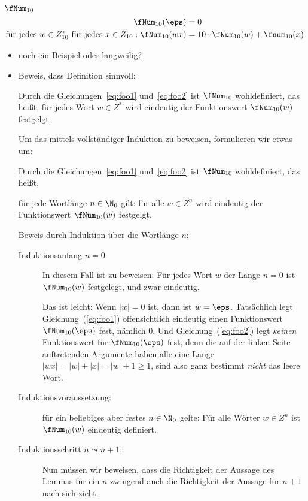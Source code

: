 %
\begin{tutorium}
\noindent\textbf{$\fNum_{10}$}
  \begin{align}
    \fNum_{10}(\eps) &= 0  \label{eq:foo1} \\
    \text{für jedes }  w\in Z_{10}^* \,\, \text{für jedes }  x\in Z_{10}: \fNum_{10}(wx) &= 10\cdot \fNum_{10}(w) + \fnum_{10}(x) \label{eq:foo2} 
  \end{align}


  \begin{itemize}
  \item noch ein Beispiel oder langweilig?
  \item Beweis, dass Definition sinnvoll:

    \begin{lemma}
      Durch die Gleichungen~\ref{eq:foo1} und~\ref{eq:foo2} ist
      $\fNum_{10}$ wohldefiniert, das heißt, für jedes Wort $w\in Z^*$
      wird eindeutig der Funktionswert $\fNum_{10}(w)$ festgelgt.
    \end{lemma}

    Um das mittels vollständiger Induktion zu beweisen, formulieren
    wir etwas um:

    \begin{lemma}
      Durch die Gleichungen~\ref{eq:foo1} und~\ref{eq:foo2} ist
      $\fNum_{10}$ wohldefiniert, das heißt, 

      für jede Wortlänge $n\in\N_0$ gilt: für alle $w\in Z^n$
      wird eindeutig der Funktionswert $\fNum_{10}(w)$ festgelgt.
    \end{lemma}

    \begin{beweis}
      Beweis durch Induktion über die Wortlänge $n$:

      \begin{description}
      \item[Induktionsanfang $n=0$:] In diesem Fall ist zu beweisen: Für
        jedes Wort $w$ der Länge $n=0$ ist $\fNum_{10}(w)$ festgelegt, und
        zwar eindeutig.

        Das ist leicht: Wenn $|w|=0$ ist, dann ist $w=\eps$. Tatsächlich
        legt Gleichung~(\ref{eq:foo1}) offensichtlich eindeutig einen
        Funktionswert $\fNum_{10}(\eps)$ fest, nämlich $0$. Und
        Gleichung~(\ref{eq:foo2}) legt \emph{keinen} Funktionswert für
        $\fNum_{10}(\eps)$ fest, denn die auf der linken Seite
        auftretenden Argumente haben alle eine Länge
        $|wx|=|w|+|x|=|w|+1\geq 1$, sind also ganz bestimmt \emph{nicht}
        das leere Wort.
      \item[Induktionsvoraussetzung:] für ein beliebiges aber festes
        $n\in\N_0$ gelte: Für alle Wörter $w\in Z^n$ ist
        $\fNum_{10}(w)$ eindeutig definiert.
      \item[Induktionsschritt $n\leadsto n+1$:] Nun müssen wir beweisen, dass die
        Richtigkeit der Aussage des Lemmas für ein $n$ zwingend auch die
        Richtigkeit der Aussage für $n+1$ nach sich zieht.
        

\end{description}
\end{beweis}
\end{itemize}
\end{tutorium}
